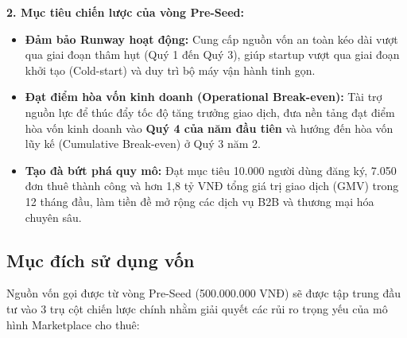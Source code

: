 \textbf{2. Mục tiêu chiến lược của vòng Pre-Seed:}
\begin{itemize}
    \item \textbf{Đảm bảo Runway hoạt động:} Cung cấp nguồn vốn an toàn kéo dài vượt qua giai đoạn thâm hụt (Quý 1 đến Quý 3), giúp startup vượt qua giai đoạn khởi tạo (Cold-start) và duy trì bộ máy vận hành tinh gọn.
    \item \textbf{Đạt điểm hòa vốn kinh doanh (Operational Break-even):} Tài trợ nguồn lực để thúc đẩy tốc độ tăng trưởng giao dịch, đưa nền tảng đạt điểm hòa vốn kinh doanh vào \textbf{Quý 4 của năm đầu tiên} và hướng đến hòa vốn lũy kế (Cumulative Break-even) ở Quý 3 năm 2.
    \item \textbf{Tạo đà bứt phá quy mô:} Đạt mục tiêu 10.000 người dùng đăng ký, 7.050 đơn thuê thành công và hơn 1,8 tỷ VNĐ tổng giá trị giao dịch (GMV) trong 12 tháng đầu, làm tiền đề mở rộng các dịch vụ B2B và thương mại hóa chuyên sâu.
\end{itemize}


\subsection{Mục đích sử dụng vốn}

Nguồn vốn gọi được từ vòng Pre-Seed (500.000.000 VNĐ) sẽ được tập trung đầu tư vào 3 trụ cột chiến lược chính nhằm giải quyết các rủi ro trọng yếu của mô hình Marketplace cho thuê:

